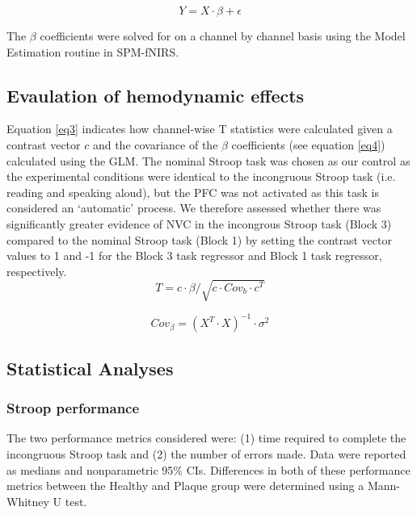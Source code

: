 \documentclass[12pt]{spieman}  %
\begin{document}
\begin{spacing}{2}
\begin{equation} \label{eq1}
Y = X \cdot \beta + \epsilon 
\end{equation}

The  $\beta$ coefficients were solved for on a channel by channel basis using the Model Estimation routine in SPM-fNIRS.

\subsection{Evaulation of hemodynamic effects} \label{sec:Tmaps}


Equation \ref{eq3} indicates how channel-wise T statistics were calculated given a contrast vector $c$ and the covariance of the $\beta$ coefficients (see equation \ref{eq4}) calculated using the GLM\cite{Huppert2016a}. The nominal Stroop task was chosen as our control as the experimental conditions were identical to the incongruous Stroop task (i.e. reading and speaking aloud), but the PFC was not activated as this task is considered an `automatic' process. We therefore assessed whether there was significantly greater evidence of NVC in the incongrous Stroop task (Block 3) compared to the nominal Stroop task (Block 1) by setting the contrast vector values to 1 and -1 for the Block 3 task regressor and Block 1 task regressor, respectively.
\begin{equation}\label{eq3}
T = c \cdot \beta/\sqrt{c \cdot Cov_{b} \cdot c^{T}}
\end{equation}

\begin{equation}\label{eq4}
Cov_{\beta} = (X^{T} \cdot X)^{-1} \cdot \sigma^{2}
\end{equation} 


\subsection{Statistical Analyses}

\subsubsection{Stroop performance}
The two performance metrics considered were: (1) time required to complete the incongruous Stroop task and (2) the number of errors made. Data were reported as medians and nonparametric 95\% CIs. Differences in both of these performance metrics between the Healthy and Plaque group were determined using a Mann-Whitney U test.


\end{spacing}
\end{document}

